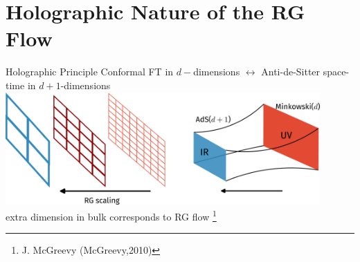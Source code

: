 \documentclass[12pt,aspectratio=169]{beamer}
\begin{document}
\section{Holographic Nature of the RG Flow}
\begin{frame}{Holographic Principle}
Conformal FT in \(d-\)dimensions \(\longleftrightarrow\) Anti-de-Sitter space-time in \(d+1\)-dimensions\\[10pt]
\includegraphics[width=0.9\textwidth]{figures/holography.pdf}\\[10pt]
extra dimension in bulk corresponds to \alert{RG flow}
\footnote{J. McGreevy (McGreevy,2010)}
\end{frame}
\end{document}
